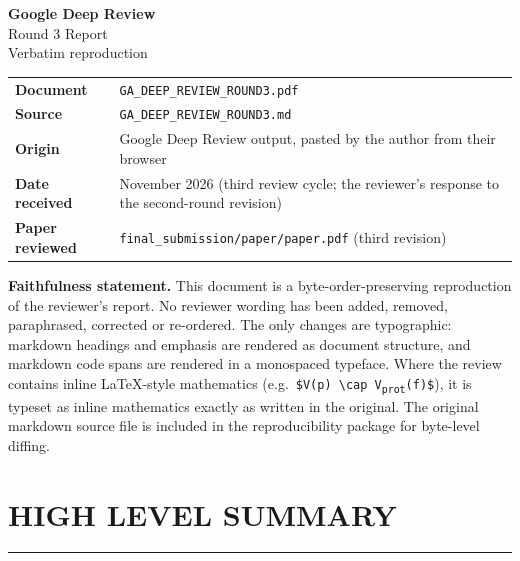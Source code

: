 \documentclass[11pt,a4paper]{article}
\begin{document}
\begin{titlepage}
\vspace*{2.8cm}
{\color{ink}\Huge\bfseries Google Deep Review\\\bigskip}
{\color{ink}\Large Round 3 Report\\\bigskip}
{\color{quote}\large Verbatim reproduction}\vspace{1.5cm}

\begin{tabular}{@{}ll@{}}
\textbf{Document} & \texttt{GA\_DEEP\_REVIEW\_ROUND3.pdf} \\
\textbf{Source} & \texttt{GA\_DEEP\_REVIEW\_ROUND3.md} \\
\textbf{Origin} & Google Deep Review output, pasted by the author from their browser \\
\textbf{Date received} & November 2026 (third review cycle; the reviewer's response to the second-round revision) \\
\textbf{Paper reviewed} & \texttt{final\_submission/paper/paper.pdf} (third revision) \\
\bottomrule
\end{tabular}

\vspace{1.0cm}
\noindent\textbf{Faithfulness statement.} This document is a byte-order-preserving
reproduction of the reviewer's report. No reviewer wording has been added, removed,
paraphrased, corrected or re-ordered. The only changes are typographic: markdown
headings and emphasis are rendered as document structure, and markdown code spans
are rendered in a monospaced typeface. Where the review contains inline LaTeX-style
mathematics (e.g.\ \texttt{\$V(p) \textbackslash cap V\textsubscript{prot}(f)\$}),
it is typeset as inline mathematics exactly as written in the original. The original
markdown source file is included in the reproducibility package for byte-level diffing.

\vfill
\end{titlepage}
\section*{HIGH LEVEL SUMMARY}
\par\medskip\noindent\rule{\linewidth}{0.4pt}\medskip\par
\end{document}
